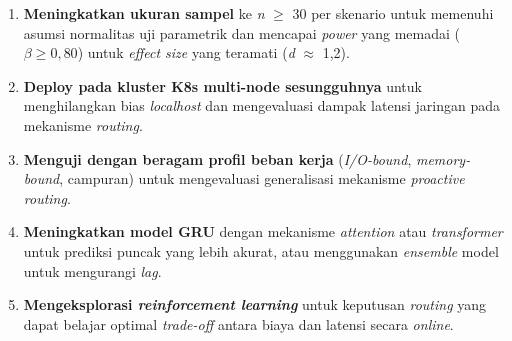 \begin{enumerate}
    \item \textbf{Meningkatkan ukuran sampel} ke \emph{n} $\geq$ 30 per skenario untuk memenuhi asumsi normalitas uji parametrik dan mencapai \emph{power} yang memadai ($\beta \geq 0,80$) untuk \emph{effect size} yang teramati (\emph{d} $\approx$ 1,2).

    \item \textbf{Deploy pada kluster K8s multi-node sesungguhnya} untuk menghilangkan bias \emph{localhost} dan mengevaluasi dampak latensi jaringan pada mekanisme \emph{routing}.

    \item \textbf{Menguji dengan beragam profil beban kerja} (\emph{I/O-bound}, \emph{memory-bound}, campuran) untuk mengevaluasi generalisasi mekanisme \emph{proactive routing}.

    \item \textbf{Meningkatkan model GRU} dengan mekanisme \emph{attention} atau \emph{transformer} untuk prediksi puncak yang lebih akurat, atau menggunakan \emph{ensemble} model untuk mengurangi \emph{lag}.

    \item \textbf{Mengeksplorasi \emph{reinforcement learning}} untuk keputusan \emph{routing} yang dapat belajar optimal \emph{trade-off} antara biaya dan latensi secara \emph{online}.
\end{enumerate}
